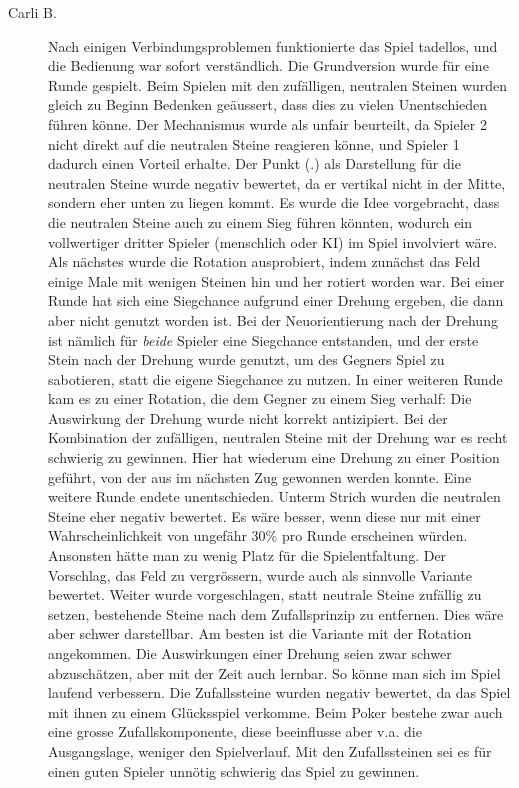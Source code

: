 \documentclass[a4paper,11pt,hidelinks]{scrartcl}
\begin{document}
\begin{description}
    \item[Carli B.] Nach einigen Verbindungsproblemen funktionierte das Spiel tadellos, und die Bedienung war sofort verständlich. Die Grundversion wurde für eine Runde gespielt. Beim Spielen mit den zufälligen, neutralen Steinen wurden gleich zu Beginn Bedenken geäussert, dass dies zu vielen Unentschieden führen könne. Der Mechanismus wurde als unfair beurteilt, da Spieler 2 nicht direkt auf die neutralen Steine reagieren könne, und Spieler 1 dadurch einen Vorteil erhalte. Der Punkt (.) als Darstellung für die neutralen Steine wurde negativ bewertet, da er vertikal nicht in der Mitte, sondern eher unten zu liegen kommt. Es wurde die Idee vorgebracht, dass die neutralen Steine auch zu einem Sieg führen könnten, wodurch ein vollwertiger dritter Spieler (menschlich oder KI) im Spiel involviert wäre. Als nächstes wurde die Rotation ausprobiert, indem zunächst das Feld einige Male mit wenigen Steinen hin und her rotiert worden war. Bei einer Runde hat sich eine Siegchance aufgrund einer Drehung ergeben, die dann aber nicht genutzt worden ist. Bei der Neuorientierung nach der Drehung ist nämlich für \textit{beide} Spieler eine Siegchance entstanden, und der erste Stein nach der Drehung wurde genutzt, um des Gegners Spiel zu sabotieren, statt die eigene Siegchance zu nutzen. In einer weiteren Runde kam es zu einer Rotation, die dem Gegner zu einem Sieg verhalf: Die Auswirkung der Drehung wurde nicht korrekt antizipiert. Bei der Kombination der zufälligen, neutralen Steine mit der Drehung war es recht schwierig zu gewinnen. Hier hat wiederum eine Drehung zu einer Position geführt, von der aus im nächsten Zug gewonnen werden konnte. Eine weitere Runde endete unentschieden. Unterm Strich wurden die neutralen Steine eher negativ bewertet. Es wäre besser, wenn diese nur mit einer Wahrscheinlichkeit von ungefähr 30\% pro Runde erscheinen würden. Ansonsten hätte man zu wenig Platz für die Spielentfaltung. Der Vorschlag, das Feld zu vergrössern, wurde auch als sinnvolle Variante bewertet. Weiter wurde vorgeschlagen, statt neutrale Steine zufällig zu setzen, bestehende Steine nach dem Zufallsprinzip zu entfernen. Dies wäre aber schwer darstellbar. Am besten ist die Variante mit der Rotation angekommen. Die Auswirkungen einer Drehung seien zwar schwer abzuschätzen, aber mit der Zeit auch lernbar. So könne man sich im Spiel laufend verbessern. Die Zufallssteine wurden negativ bewertet, da das Spiel mit ihnen zu einem Glücksspiel verkomme. Beim Poker bestehe zwar auch eine grosse Zufallskomponente, diese beeinflusse aber v.a. die Ausgangslage, weniger den Spielverlauf. Mit den Zufallssteinen sei es für einen guten Spieler unnötig schwierig das Spiel zu gewinnen.
\end{description}
\end{document}
